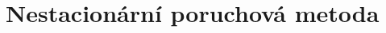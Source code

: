 \section{Nestacionární poruchová metoda}
\label{sec:NestacionarniPT}

\begin{theory}
	
	
\end{theory}





